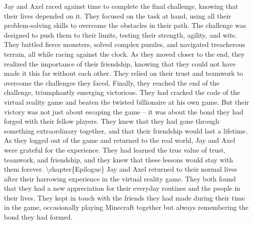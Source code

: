 \documentclass{book}%
\begin{document}
\newline%
Jay and Axel raced against time to complete the final challenge, knowing that their lives depended on it. They focused on the task at hand, using all their problem{-}solving skills to overcome the obstacles in their path.\newline%
\newline%
The challenge was designed to push them to their limits, testing their strength, agility, and wits. They battled fierce monsters, solved complex puzzles, and navigated treacherous terrain, all while racing against the clock.\newline%
\newline%
As they moved closer to the end, they realized the importance of their friendship, knowing that they could not have made it this far without each other. They relied on their trust and teamwork to overcome the challenges they faced.\newline%
\newline%
Finally, they reached the end of the challenge, triumphantly emerging victorious. They had cracked the code of the virtual reality game and beaten the twisted billionaire at his own game.\newline%
\newline%
But their victory was not just about escaping the game – it was about the bond they had forged with their fellow players. They knew that they had gone through something extraordinary together, and that their friendship would last a lifetime.\newline%
\newline%
As they logged out of the game and returned to the real world, Jay and Axel were grateful for the experience. They had learned the true value of trust, teamwork, and friendship, and they knew that these lessons would stay with them forever.%
\textbackslash{}chapter\{Epilogue\}\newline%
\newline%
Jay and Axel returned to their normal lives after their harrowing experience in the virtual reality game. They both found that they had a new appreciation for their everyday routines and the people in their lives.\newline%
\newline%
They kept in touch with the friends they had made during their time in the game, occasionally playing Minecraft together but always remembering the bond they had formed.\newline%
\newline%
\end{document}
